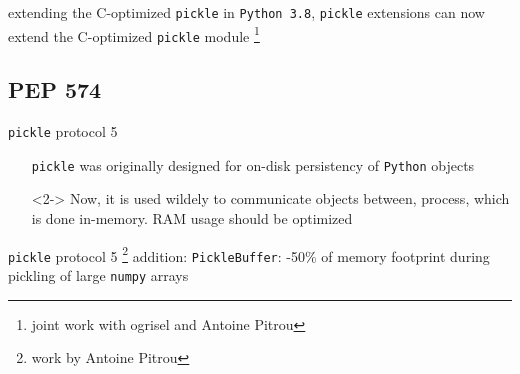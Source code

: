 \documentclass[13pt, usenames,dvipsnames]{beamer} %
\newcommand{\mycode}[2][\tiny] {\texttt{#2}}
\begin{document}
    \begin{frame}[fragile]{extending the C-optimized \mycode[\small]{pickle}}
        in \mycode{Python 3.8}, \mycode{pickle} extensions can now extend the
        C-optimized \mycode{pickle} module \footnote{\tiny joint work with ogrisel and Antoine Pitrou}
    \end{frame}
\subsection{PEP 574}
\begin{frame}[t]{\mycode[\small]{pickle} protocol 5}
        \vspace{2em}
        \begin{itemize}
            \footnotesize
              \setlength\itemsep{1em}
              \item[] \faDatabase \quad \mycode{pickle} was originally designed for on-disk
                  persistency of \mycode{Python} objects
               \item[]<2-> \faExchange \quad Now, it is used wildely to communicate objects between,
                process, which is done in-memory. RAM usage should be optimized
        \end{itemize}
        \vspace{1em}
        \mycode[\small]{pickle} protocol 5 \footnote{work by Antoine Pitrou} addition:
        \mycode[\small]{PickleBuffer}: -50\% of memory footprint during
        pickling of large \mycode[\small]{numpy} arrays
    \end{frame}
\end{document}
